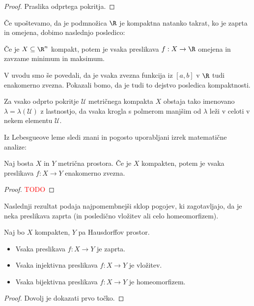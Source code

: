 \begin{proof}
    Praslika odprtega pokritja.
\end{proof}
Če upoštevamo, da je podmnožica \(\R\) je kompaktna natanko takrat, ko je zaprta in omejena, dobimo naslednjo posledico:
\begin{posledica}
    Če je $X \subseteq \R^n$ kompakt, potem je vsaka preslikava $f: X \to \R$ omejena in zavzame minimum in maksimum.
\end{posledica}

V uvodu smo še povedali, da je vsaka zvezna funkcija iz $[a,b]$ v \(\R\) tudi enakomerno zvezna. Pokazali bomo, da je tudi to dejstvo posledica kompaktnosti.

\begin{izrek}
    Za vsako odprto pokritje \(\mathcal{U}\) metričnega kompakta $X$ obstaja tako imenovano  $\lambda = \lambda (\mathcal{U})$ z lastnostjo, da vsaka krogla s polmerom manjšim od $\lambda$ leži v celoti v nekem elementu $\mathcal{U}$.
\end{izrek}

Iz Lebesgueove leme sledi znani in pogosto uporabljani izrek matematične analize:
\begin{izrek}
    Naj bosta $X$ in $Y$ metrična prostora. Če je $X$ kompakten, potem je vsaka preslikava $f: X \to Y$ enakomerno zvezna.
\end{izrek}

\begin{proof}
    \textcolor{red}{TODO}
\end{proof}

Naslednji rezultat podaja najpomembnejši sklop pogojev, ki zagotavljajo, da je neka preslikava zaprta (in posledično vložitev ali celo homeomorfizem).

\begin{izrek}
    Naj bo $X$ kompakten, $Y$ pa Hausdorffov prostor.
    \begin{itemize}
        \item Vsaka preslikava $f: X \to Y$ je zaprta.
        \item Vsaka injektivna preslikava \(f:  X \to Y\) je vložitev.
        \item Vsaka bijektivna preslikava \(f:  X \to Y\) je homeomorfizem.
    \end{itemize}
\end{izrek}

\begin{proof}
    Dovolj je dokazati prvo točko.
\end{proof}

